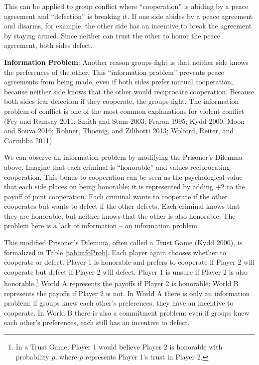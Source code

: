 \documentclass[11pt]{article}
\begin{document}
This can be applied to group conflict where ``cooperation'' is abiding
by a peace agreement and ``defection'' is breaking it. If one side
abides by a peace agreement and disarms, for example, the other side has
an incentive to break the agreement by staying armed. Since neither can
trust the other to honor the peace agreement, both sides defect.\newline

\noindent \textbf{Information Problem}: Another reason groups fight is
that neither side knows the preferences of the other. This ``information
problem'' prevents peace agreements from being made, even if both sides
prefer mutual cooperation, because neither side knows that the other
would reciprocate cooperation. Because both sides fear defection if they
cooperate, the groups fight. The information problem of conflict is one
of the most common explanations for violent conflict (Fey and Ramsay
2011; Smith and Stam 2003; Fearon 1995; Kydd 2000; Moon and Souva 2016;
Rohner, Thoenig, and Zilibotti 2013; Wolford, Reiter, and Carrubba 2011)

We can observe an information problem by modifying the Prisoner's
Dilemma above. Imagine that each criminal is ``honorable'' and values
reciprocating cooperation. This bonus to cooperation can be seen as the
psychological value that each side places on being honorable; it is
represented by adding +2 to the payoff of joint cooperation. Each
criminal wants to cooperate if the other cooperates but wants to defect
if the other defects. Each criminal knows that they are honorable, but
neither knows that the other is also honorable. The problem here is a
lack of information -- an information problem.

This modified Prisoner's Dilemma, often called a Trust Game (Kydd 2000),
is formalized in Table \ref{tab:infoProb}. Each player again chooses
whether to cooperate or defect. Player 1 is honorable and prefers to
cooperate if Player 2 will cooperate but defect if Player 2 will defect.
Player 1 is unsure if Player 2 is also honorable.\footnote{In a Trust
  Game, Player 1 would believe Player 2 is honorable with probability
  \(p\), where \(p\) represents Player 1's trust in Player 2.} World A
represents the payoffs if Player 2 is honorable; World B represents the
payoffs if Player 2 is not. In World A there is only an information
problem: if groups knew each other's preferences, they have an incentive
to cooperate. In World B there is also a commitment problem: even if
groups knew each other's preferences, each still has an incentive to
defect.
\end{document}
